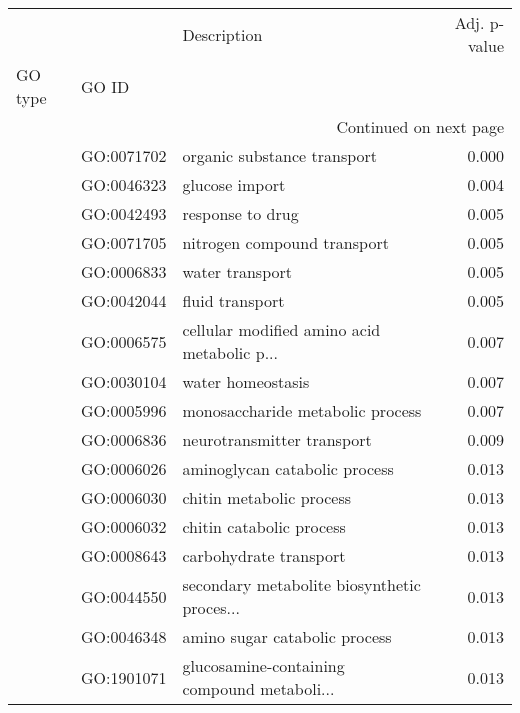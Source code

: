 \begin{longtable}{lllr}
\toprule
   &            &                                  Description &  Adj. p-value \\
GO type & GO ID &                                              &               \\
\midrule
\endhead
\midrule
\multicolumn{4}{r}{{Continued on next page}} \\
\midrule
\endfoot

\bottomrule
\endlastfoot
\multirow{37}{*}{BP} & GO:0071702 &                  organic substance transport &         0.000 \\
   & GO:0046323 &                               glucose import &         0.004 \\
   & GO:0042493 &                             response to drug &         0.005 \\
   & GO:0071705 &                  nitrogen compound transport &         0.005 \\
   & GO:0006833 &                              water transport &         0.005 \\
   & GO:0042044 &                              fluid transport &         0.005 \\
   & GO:0006575 &  cellular modified amino acid metabolic p... &         0.007 \\
   & GO:0030104 &                            water homeostasis &         0.007 \\
   & GO:0005996 &             monosaccharide metabolic process &         0.007 \\
   & GO:0006836 &                   neurotransmitter transport &         0.009 \\
   & GO:0006026 &                aminoglycan catabolic process &         0.013 \\
   & GO:0006030 &                     chitin metabolic process &         0.013 \\
   & GO:0006032 &                     chitin catabolic process &         0.013 \\
   & GO:0008643 &                       carbohydrate transport &         0.013 \\
   & GO:0044550 &  secondary metabolite biosynthetic proces... &         0.013 \\
   & GO:0046348 &                amino sugar catabolic process &         0.013 \\
   & GO:1901071 &  glucosamine-containing compound metaboli... &         0.013 \\

\end{longtable}
